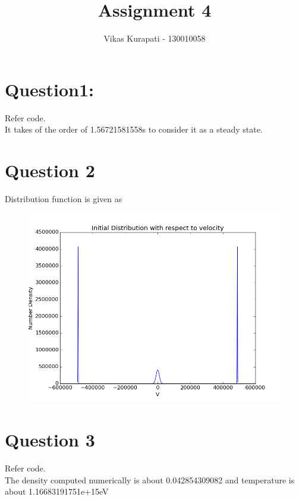 \documentclass[11pt, a4paper]{article}
\title{\textbf{Assignment 4}}
\author{Vikas Kurapati - 130010058}
\begin{document}
\maketitle
\newpage
\section{Question1:}
Refer code. \\
It takes of the order of 1.56721581558s to consider it as a steady state.

\section{Question 2}
Distribution function is given as
\begin{figure}[H]
 \centering
 \includegraphics[width = \textwidth]{q2.png}
\end{figure}

\section{Question 3}
Refer code. \\
The density computed numerically is about 0.042854309082 and temperature is about 1.16683191751e+15eV
\end{document}
